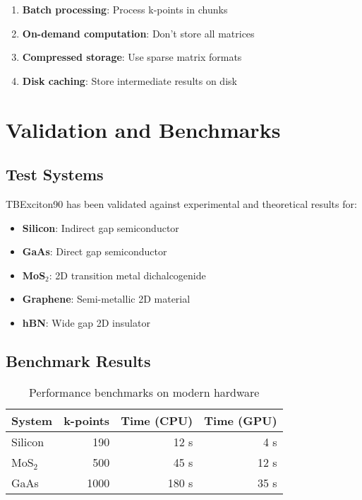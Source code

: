 \documentclass[11pt,a4paper]{article}
\begin{document}
\begin{enumerate}
    \item \textbf{Batch processing}: Process k-points in chunks
    \item \textbf{On-demand computation}: Don't store all matrices
    \item \textbf{Compressed storage}: Use sparse matrix formats
    \item \textbf{Disk caching}: Store intermediate results on disk
\end{enumerate}

\section{Validation and Benchmarks}

\subsection{Test Systems}

TBExciton90 has been validated against experimental and theoretical results for:

\begin{itemize}
    \item \textbf{Silicon}: Indirect gap semiconductor
    \item \textbf{GaAs}: Direct gap semiconductor  
    \item \textbf{MoS$_2$}: 2D transition metal dichalcogenide
    \item \textbf{Graphene}: Semi-metallic 2D material
    \item \textbf{hBN}: Wide gap 2D insulator
\end{itemize}

\subsection{Benchmark Results}

\begin{table}[H]
\centering
\begin{tabular}{lrrr}
\toprule
System & k-points & Time (CPU) & Time (GPU) \\
\midrule
Silicon & 190 & 12 s & 4 s \\
MoS$_2$ & 500 & 45 s & 12 s \\
GaAs & 1000 & 180 s & 35 s \\
\bottomrule
\end{tabular}
\caption{Performance benchmarks on modern hardware}
\end{table}
\end{document}
